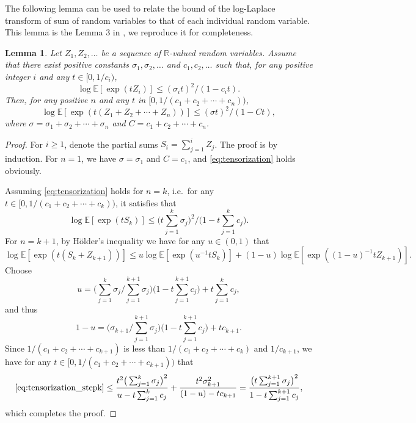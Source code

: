 \documentclass[11pt]{article}
\theoremstyle{plain}
\newtheorem{lemma}[theorem]{Lemma}
\theoremstyle{definition}
\begin{document}
The following lemma can be used to relate the bound of the log-Laplace transform of sum of random variables to that of each individual random variable. This lemma is the Lemma 3 in \cite{merlevede2011bernstein}, we reproduce it for completeness.
\begin{lemma}\label{lemma:aggregate_log-laplace}
    Let $Z_1, Z_2, \dots$ be a sequence of $\mathbb{R}$-valued random variables. Assume that there exist positive constants $\sigma_1, \sigma_2, \dots$ and $c_1, c_2, \dots$ such that, for any positive integer $i$ and any $t \in [0, 1/c_i)$,
    \begin{equation*}
        \log\mathbb{E}[\exp(tZ_i)] \leq (\sigma_it)^2/(1-c_it).
    \end{equation*}
    Then, for any positive $n$ and any $t$ in $[0,1/(c_1+c_2+ \cdots+c_n))$,
    \begin{equation}\label{eq:tensorization}
        \log\mathbb{E}[\exp(t(Z_1+Z_2+\cdots+Z_n))] \leq (\sigma t)^2/(1-Ct),
    \end{equation}
    where $\sigma = \sigma_1+\sigma_2+\cdots+\sigma_n$ and $C = c_1+c_2+\cdots+c_n$.
\end{lemma}
\begin{proof}
    For $i \geq 1$, denote the partial sums $S_i = \sum_{j = 1}^iZ_j$. The proof is by induction.
    For $n = 1$, we have $\sigma = \sigma_1$ and $C = c_1$, and \eqref{eq:tensorization} holds obviously.
    
    Assuming \eqref{eq:tensorization} holds for $n = k$, i.e.~for any $t \in [0,1/(c_1+c_2+\cdots+c_k))$, it satisfies that
    \begin{equation*}
        \log\mathbb{E}[\exp(tS_k)] \leq \Big(t\sum_{j=1}^k\sigma_j\Big)^2\Big/\Big(1-t\sum_{j=1}^kc_j\Big).
    \end{equation*}
    For $n = k+1$, by H\"older's inequality we have for any $u \in (0,1)$ that
    \begin{equation} \label{eq:tensorization_stepk}
        \log\mathbb{E}[\exp(t(S_k+Z_{k+1}))] \leq u\log\mathbb{E}[\exp(u^{-1}tS_k)] + (1-u)\log\mathbb{E}[\exp((1-u)^{-1}tZ_{k+1})].
    \end{equation}
    Choose
    \begin{equation*}
        u = \Big(\sum_{j = 1}^{k}\sigma_j\Big/\sum_{j = 1}^{k+1}\sigma_j\Big)\Big(1 - t\sum_{j = 1}^{k+1}c_j\Big) + t\sum_{j = 1}^{k}c_j,
    \end{equation*}
    and thus 
    \begin{equation*}
        1-u = \Big(\sigma_{k+1}\Big/\sum_{j = 1}^{k+1}\sigma_j\Big)\Big(1 - t\sum_{j = 1}^{k+1}c_j\Big) + tc_{k+1}.        
    \end{equation*}
    Since $1/(c_1+c_2+\cdots+c_{k+1})$ is less than $1/(c_1+c_2+\cdots+c_{k})$ and $1/c_{k+1}$,
    we have for any $t \in [0, 1/(c_1+c_2+\cdots+c_{k+1}))$ that
    \begin{equation*}
        \eqref{eq:tensorization_stepk} \leq \frac{t^2\big(\sum_{j=1}^{k}\sigma_j\big)^2}{u - t\sum_{j=1}^{k}c_j} + \frac{t^2\sigma_{k+1}^2}{(1-u)-tc_{k+1}} = \frac{\big(t\sum_{j=1}^{k+1}\sigma_j\big)^2}{1 - t\sum_{j = 1}^{k+1}c_j},
    \end{equation*}
    which completes the proof.
\end{proof}
\end{document}
